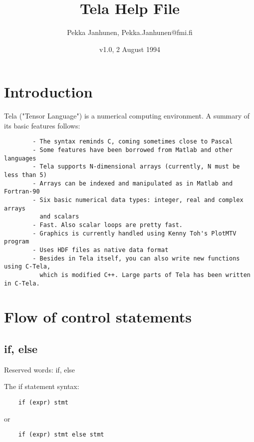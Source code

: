 \documentclass[a4paper]{article}
\title{Tela Help File}
\author{Pekka Janhunen, {\ttfamily Pekka.Janhunen@fmi.fi}}
\date{v1.0, 2 August 1994}
\begin{document}
\maketitle
\tableofcontents

\section{Introduction}

Tela ("Tensor Language") is a numerical computing environment. A summary of its
basic features follows:

\begin{verbatim}
        - The syntax reminds C, coming sometimes close to Pascal
        - Some features have been borrowed from Matlab and other languages
        - Tela supports N-dimensional arrays (currently, N must be less than 5)
        - Arrays can be indexed and manipulated as in Matlab and Fortran-90
        - Six basic numerical data types: integer, real and complex arrays
          and scalars
        - Fast. Also scalar loops are pretty fast.
        - Graphics is currently handled using Kenny Toh's PlotMTV program
        - Uses HDF files as native data format
        - Besides in Tela itself, you can also write new functions using C-Tela,
          which is modified C++. Large parts of Tela has been written in C-Tela.
\end{verbatim}





\section{Flow of control statements}


\subsection{if, else\label{if}}

Reserved words: if, else

The if statement syntax:
\begin{tscreen}
\begin{verbatim}
    if (expr) stmt
\end{verbatim}
\end{tscreen}

or
\begin{tscreen}
\begin{verbatim}
    if (expr) stmt else stmt
\end{verbatim}
\end{tscreen}
\end{document}
